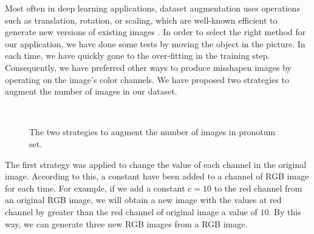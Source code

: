 \documentclass[review]{elsarticle}
\begin{document}
Most often in deep learning applications, dataset augmentation uses operations such as translation, rotation, or scaling, which are well-known efficient to generate new versions of existing images \cite{krizhevsky2012imagenet, shorten2019survey}. In order to select the right method for our application, we have done some tests by moving the object in the picture. In each time, we have quickly gone to the over-fitting in the training step. Consequently, we have preferred other ways to produce misshapen images by operating on the image's color channels. We have proposed two strategies to augment the number of images in our dataset.%

\begin{figure}[h!]
    \centering
    ~~
    \caption{The two strategies to augment the number of images in pronotum set.}
    \label{figdataauge}
\end{figure}

The first strategy was applied to change the value of each channel in the original image. According to this, a constant have been added to a channel of RGB image for each time. For example, if we add a constant $c = 10$ to the red channel from an original RGB image, we will obtain a new image with the values at red channel by greater than the red channel of original image a value of $10$. By this way, we can generate three new RGB images from a RGB image.
\end{document}
